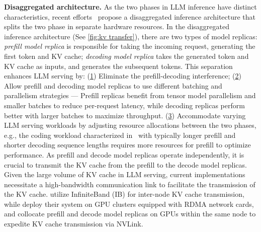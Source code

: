 \textbf{Disaggregated architecture.}
As the two phases in LLM inference have distinct characteristics, recent efforts~\citep{zhong2024distserve,patel2024splitwise,jin2024p,qin2024mooncake,hu2024inference} propose a disaggregated inference architecture that splits the two phase in separate hardware resources. 
In the disaggregated inference architecture (See \autoref{fig:kv transfer}), there are two types of model replicas: \textit{prefill model replica} is responsible for taking the incoming request, generating the first token and KV cache; \textit{decoding model replica} takes the generated token and KV cache as inputs, and generates the subsequent tokens. This separation enhances LLM serving by:
(\underline{1}) Eliminate the prefill-decoding interference; 
(\underline{2}) Allow prefill and decoding model replicas to use different batching and parallelism strategies --- Prefill replicas benefit from tensor model parallelism and smaller batches to reduce per-request latency, while decoding replicas perform better with larger batches to maximize throughput.
(\underline{3}) Accommodate varying LLM serving workloads by adjusting resource allocations between the two phases, e.g., the coding workload characterized in~\citep{patel2024splitwise} with typically longer prefill and shorter decoding sequence lengths requires more resources for prefill to optimize performance. As prefill and decode model replicas operate independently, it is crucial to transmit the KV cache from the prefill to the decode model replicas. Given the large volume of KV cache in LLM serving, current implementations necessitate a high-bandwidth communication link to facilitate the transmission of the KV cache. \citep{patel2024splitwise} utilize InfiniteBand (IB) for inter-node KV cache transmission, while \citep{qin2024mooncake} deploy their system on GPU clusters equipped with RDMA network cards, and \citep{zhong2024distserve} collocate prefill and decode model replicas on GPUs within the same node to expedite KV cache transmission via NVLink. %
